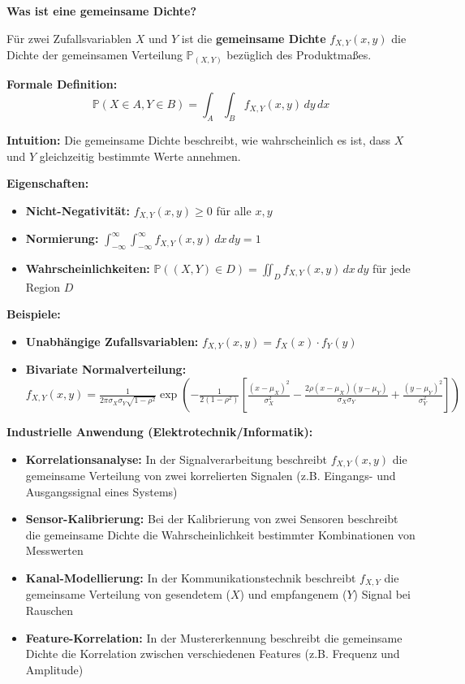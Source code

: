 \begin{denoobification}
\textbf{Was ist eine gemeinsame Dichte?}

Für zwei Zufallsvariablen $X$ und $Y$ ist die \textbf{gemeinsame Dichte} $f_{X,Y}(x,y)$ die Dichte der gemeinsamen Verteilung $\mathbb{P}_{(X,Y)}$ bezüglich des Produktmaßes.

\textbf{Formale Definition:}
\[
\mathbb{P}(X \in A, Y \in B) = \int_A \int_B f_{X,Y}(x,y) \, dy \, dx
\]

\textbf{Intuition:} Die gemeinsame Dichte beschreibt, wie wahrscheinlich es ist, dass $X$ und $Y$ gleichzeitig bestimmte Werte annehmen.

\textbf{Eigenschaften:}
\begin{itemize}
    \item \textbf{Nicht-Negativität:} $f_{X,Y}(x,y) \geq 0$ für alle $x, y$
    \item \textbf{Normierung:} $\int_{-\infty}^{\infty} \int_{-\infty}^{\infty} f_{X,Y}(x,y) \, dx \, dy = 1$
    \item \textbf{Wahrscheinlichkeiten:} $\mathbb{P}((X,Y) \in D) = \iint_D f_{X,Y}(x,y) \, dx \, dy$ für jede Region $D$
\end{itemize}

\textbf{Beispiele:}
\begin{itemize}
    \item \textbf{Unabhängige Zufallsvariablen:} $f_{X,Y}(x,y) = f_X(x) \cdot f_Y(y)$
    \item \textbf{Bivariate Normalverteilung:} $f_{X,Y}(x,y) = \frac{1}{2\pi\sigma_X\sigma_Y\sqrt{1-\rho^2}} \exp\left(-\frac{1}{2(1-\rho^2)}\left[\frac{(x-\mu_X)^2}{\sigma_X^2} - \frac{2\rho(x-\mu_X)(y-\mu_Y)}{\sigma_X\sigma_Y} + \frac{(y-\mu_Y)^2}{\sigma_Y^2}\right]\right)$
\end{itemize}

\textbf{Industrielle Anwendung (Elektrotechnik/Informatik):}
\begin{itemize}
    \item \textbf{Korrelationsanalyse:} In der Signalverarbeitung beschreibt $f_{X,Y}(x,y)$ die gemeinsame Verteilung von zwei korrelierten Signalen (z.B. Eingangs- und Ausgangssignal eines Systems)
    \item \textbf{Sensor-Kalibrierung:} Bei der Kalibrierung von zwei Sensoren beschreibt die gemeinsame Dichte die Wahrscheinlichkeit bestimmter Kombinationen von Messwerten
    \item \textbf{Kanal-Modellierung:} In der Kommunikationstechnik beschreibt $f_{X,Y}$ die gemeinsame Verteilung von gesendetem ($X$) und empfangenem ($Y$) Signal bei Rauschen
    \item \textbf{Feature-Korrelation:} In der Mustererkennung beschreibt die gemeinsame Dichte die Korrelation zwischen verschiedenen Features (z.B. Frequenz und Amplitude)
\end{itemize}


\end{denoobification}
